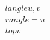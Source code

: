 \documentclass[preview]{standalone}
\begin{document}
\begin{align*}
\quad\\langle u, v \quad\\rangle = u^\quad\\top v
\end{align*}
\end{document}
